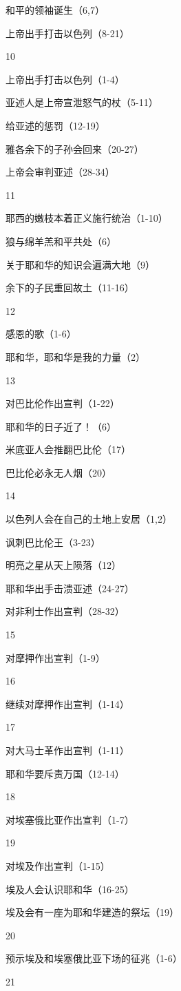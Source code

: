 和平的领袖诞生（6,7）

上帝出手打击以色列（8-21）

10

上帝出手打击以色列（1-4）

亚述人是上帝宣泄怒气的杖（5-11）

给亚述的惩罚（12-19）

雅各余下的子孙会回来（20-27）

上帝会审判亚述（28-34）

11

耶西的嫩枝本着正义施行统治（1-10）

狼与绵羊羔和平共处（6）

关于耶和华的知识会遍满大地（9）

余下的子民重回故土（11-16）

12

感恩的歌（1-6）

耶和华，耶和华是我的力量（2）

13

对巴比伦作出宣判（1-22）

耶和华的日子近了！（6）

米底亚人会推翻巴比伦（17）

巴比伦必永无人烟（20）

14

以色列人会在自己的土地上安居（1,2）

讽刺巴比伦王（3-23）

明亮之星从天上陨落（12）

耶和华出手击溃亚述（24-27）

对非利士作出宣判（28-32）

15

对摩押作出宣判（1-9）

16

继续对摩押作出宣判（1-14）

17

对大马士革作出宣判（1-11）

耶和华要斥责万国（12-14）

18

对埃塞俄比亚作出宣判（1-7）

19

对埃及作出宣判（1-15）

埃及人会认识耶和华（16-25）

埃及会有一座为耶和华建造的祭坛（19）

20

预示埃及和埃塞俄比亚下场的征兆（1-6）

21

